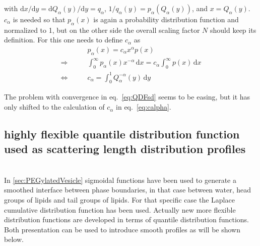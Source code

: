with  $\mathrm{d}x/\mathrm{d}y=\mathrm{d}Q_\alpha(y)/\mathrm{d}y=q_\alpha$, $1/q_\alpha(y)=p_\alpha(Q_\alpha(y))$, and $x=Q_\alpha(y)$. $c_\alpha$ is needed so that $p_\alpha(x)$ is again a probability distribution function and normalized to 1, but on the other side the overall scaling factor $N$ should keep its definition. For this one needs to define $c_\alpha$ as
\begin{align}
                   & p_\alpha(x) = c_\alpha x^\alpha p(x) \\
\Rightarrow \qquad & \int_0^\infty p_\alpha(x) x^{-\alpha}\, \mathrm{d}x = c_\alpha \int_0^\infty p(x)\, \mathrm{d}x \\
\Leftrightarrow \qquad & c_\alpha = \int_0^1 Q_\alpha^{-\alpha}(y) \, \mathrm{d}y \label{eq:calpha}
\end{align}

The problem with convergence in eq.\ \ref{eq:QDFsd} seems to be easing, but it has only shifted to the calculation of $c_\alpha$ in eq.\ \ref{eq:calpha}.

\subsection{highly flexible quantile distribution function used as scattering length distribution profiles} ~\\

In \ref{sec:PEGylatedVesicle} sigmoidal functions have been used to generate a smoothed interface between phase boundaries, in that case between water, head groups of lipids and tail groups of lipids. For that specific case the Laplace cumulative distribution function has been used. Actually new more flexible distribution functions are developed in terms of quantile distribution functions. Both presentation can be used to introduce smooth profiles as will be shown below.

